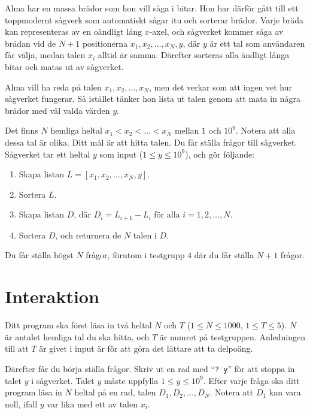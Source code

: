
Alma har en massa brädor som hon vill såga i bitar. Hon har därför gått till ett toppmodernt
sågverk som automatiskt sågar itu och sorterar brädor. Varje bräda kan representeras av en oändligt
lång $x$-axel, och sågverket kommer såga av brädan vid de $N+1$ positionerna $x_1, x_2, \dots, x_N, y$,
där $y$ är ett tal som användaren får välja, medan talen $x_i$ alltid är samma. Därefter sorteras alla
ändligt långa bitar och matas ut av sågverket. 

Alma vill ha reda på talen $x_1, x_2, \dots, x_N$, men det verkar som att ingen vet hur sågverket fungerar.
Så istället tänker hon lista ut talen genom att mata in några brädor med väl valda värden $y$.

Det finns $N$ hemliga heltal $x_1 < x_2 < \dots < x_N$ mellan $1$ och $10^9$. 
Notera att alla dessa tal är olika. Ditt mål är att hitta talen. Du får ställa frågor till sågverket. 
Sågverket tar ett heltal $y$ som input ($1 \leq y \leq 10^9$), och gör följande:

\begin{enumerate}
  \item Skapa listan $L = [x_1, x_2, \dots, x_N, y]$.
  \item Sortera $L$.
  \item Skapa listan $D$, där $D_i = L_{i+1}-L_i$ för alla $i = 1, 2, \dots, N$.
  \item Sortera $D$, och returnera de $N$ talen i $D$.
\end{enumerate}

Du får ställa högst $N$ frågor, förutom i testgrupp $4$ där du får ställa $N+1$ frågor.

\section*{Interaktion}
Ditt program ska först läsa in två heltal $N$ och $T$ ($1 \leq N \leq 1000$, $1 \leq T \leq 5$).
$N$ är antalet hemliga tal du ska hitta, och $T$ är numret på testgruppen. Anledningen till att $T$ 
är givet i input är för att göra det lättare att ta delpoäng.

Därefter får du börja ställa frågor. Skriv ut en rad med ``\verb|? y|'' för att stoppa in talet
$y$ i sågverket. Talet $y$ måste uppfylla $1 \leq y \leq 10^9$. Efter varje fråga ska
ditt program läsa in $N$ heltal på en rad, talen $D_1, D_2, \dots, D_N$. Notera att $D_1$ kan vara
noll, ifall $y$ var lika med ett av talen $x_i$.

